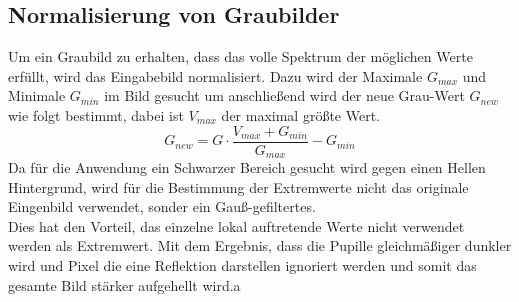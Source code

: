 \subsection{Normalisierung von Graubilder}
Um ein Graubild zu erhalten, dass das volle Spektrum der möglichen Werte erfüllt, wird das Eingabebild normalisiert. Dazu wird der Maximale $G_{max}$ und Minimale $G_{min}$ im Bild gesucht um anschließend wird der neue Grau-Wert $G_{new}$ wie folgt bestimmt, dabei ist $V_{max}$ der maximal größte Wert.
\[G_{new} = G\cdot \dfrac{V_{max}+G_{min}}{G_{max}}-G_{min}\]
Da für die Anwendung ein Schwarzer Bereich gesucht wird gegen einen Hellen Hintergrund, wird für die Bestimmung der Extremwerte nicht das originale Eingenbild verwendet, sonder ein Gauß-gefiltertes.\\
Dies hat den Vorteil, das einzelne lokal auftretende Werte nicht verwendet werden als Extremwert. Mit dem Ergebnis, dass die Pupille gleichmäßiger dunkler wird und Pixel die eine Reflektion darstellen ignoriert werden und somit das gesamte Bild stärker aufgehellt wird.a